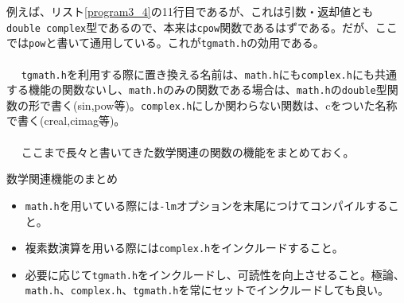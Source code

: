 例えば、リスト\ref{program3_4}の11行目であるが、これは引数・返却値とも\verb|double complex|型であるので、本来は\verb|cpow|関数であるはずである。だが、ここでは\verb|pow|と書いて通用している。これが\verb|tgmath.h|の効用である。
\\ \\　
\verb|tgmath.h|を利用する際に置き換える名前は、\verb|math.h|にも\verb|complex.h|にも共通する機能の関数ないし、\verb|math.h|のみの関数である場合は、\verb|math.h|の\verb|double|型関数の形で書く(sin,pow等)。\verb|complex.h|にしか関わらない関数は、cをついた名称で書く(creal,cimag等)。
\\ \\　
ここまで長々と書いてきた数学関連の関数の機能をまとめておく。
\begin{itembox}[l]{数学関連機能のまとめ}
\begin{itemize}
\item \verb|math.h|を用いている際には\verb|-lm|オプションを末尾につけてコンパイルすること。
\item 複素数演算を用いる際には\verb|complex.h|をインクルードすること。
\item 必要に応じて\verb|tgmath.h|をインクルードし、可読性を向上させること。極論、\verb|math.h|、\verb|complex.h|、\verb|tgmath.h|を常にセットでインクルードしても良い。
\end{itemize}
\end{itembox}
\newpage

